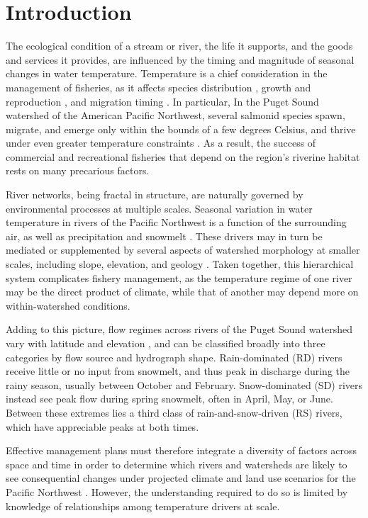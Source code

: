 \documentclass[notitlepage]{article}
\begin{document}
\section*{Introduction}

The ecological condition of a stream or river, the life it supports, and the goods and services it provides, are influenced by the timing and magnitude of seasonal changes in water temperature. Temperature is a chief consideration in the management of fisheries, as it affects species distribution \citep{Boisneau2008}, growth and reproduction \citep{mccullough1999review}, and migration timing \citep{boscarino2007effects}. In particular, In the Puget Sound watershed of the American Pacific Northwest, several salmonid species spawn, migrate, and emerge only within the bounds of a few degrees Celsius, and thrive under even greater temperature constraints \citep{carter2005effects}. As a result, the success of commercial and recreational fisheries that depend on the region's riverine habitat rests on many precarious factors.

River networks, being fractal in structure, are naturally governed by environmental processes at multiple scales. Seasonal variation in water temperature in rivers of the Pacific Northwest is a function of the surrounding air, as well as precipitation and snowmelt \citep{eldridge1967water}. These drivers may in turn be mediated or supplemented by several aspects of watershed morphology at smaller scales, including slope, elevation, and geology \citep{poole2001ecological,lisi2013association}. Taken together, this hierarchical system complicates fishery management, as the temperature regime of one river may be the direct product of climate, while that of another may depend more on within-watershed conditions.

Adding to this picture, flow regimes across rivers of the Puget Sound watershed vary with latitude and elevation \citep{reidy2012hydrogeomorphic,mauger2015CIG}, and can be classified broadly into three categories by flow source and hydrograph shape. Rain-dominated (RD) rivers receive little or no input from snowmelt, and thus peak in discharge during the rainy season, usually between October and February. Snow-dominated (SD) rivers instead see peak flow during spring snowmelt, often in April, May, or June. Between these extremes lies a third class of rain-and-snow-driven (RS) rivers, which have appreciable peaks at both times.

Effective management plans must therefore integrate a diversity of factors across space and time in order to determine which rivers and watersheds are likely to see consequential changes under projected climate and land use scenarios for the Pacific Northwest \citep{mote2010future,radeloff2012economic}. However, the understanding required to do so is limited by knowledge of relationships among temperature drivers at scale.
\end{document}

